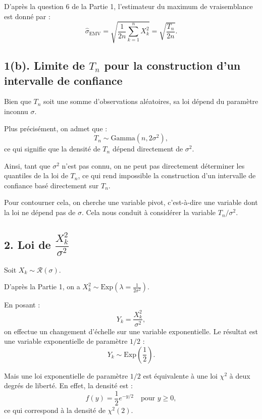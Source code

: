 \documentclass[a4paper,11pt]{article}
\begin{document}
D'après la question 6 de la Partie 1, l'estimateur du maximum de vraisemblance est donné par :
\[
\hat{\sigma}_{\text{EMV}} = \sqrt{\frac{1}{2n} \sum_{k=1}^n X_k^2} = \sqrt{\frac{T_n}{2n}}.
\]


\vspace{1em}
\subsection*{1(b). Limite de $T_n$ pour la construction d’un intervalle de confiance}

Bien que $T_n$ soit une somme d’observations aléatoires, sa loi dépend du paramètre inconnu $\sigma$.

Plus précisément, on admet que :
\[
T_n \sim \text{Gamma}(n, 2\sigma^2),
\]
ce qui signifie que la densité de $T_n$ dépend directement de $\sigma^2$.

Ainsi, tant que $\sigma^2$ n'est pas connu, on ne peut pas directement déterminer les quantiles de la loi de $T_n$, ce qui rend impossible la construction d'un intervalle de confiance basé directement sur $T_n$.

Pour contourner cela, on cherche une variable pivot, c’est-à-dire une variable dont la loi ne dépend pas de $\sigma$. Cela nous conduit à considérer la variable $T_n / \sigma^2$.

\vspace{1em}
\subsection*{2. Loi de $\dfrac{X_k^2}{\sigma^2}$}

Soit $X_k \sim \mathcal{R}(\sigma)$.

D’après la Partie 1, on a $X_k^2 \sim \text{Exp}(\lambda = \frac{1}{2\sigma^2})$.

En posant :
\[
Y_k = \frac{X_k^2}{\sigma^2},
\]
on effectue un changement d’échelle sur une variable exponentielle. Le résultat est une variable exponentielle de paramètre $1/2$ :
\[
Y_k \sim \text{Exp}\left(\frac{1}{2}\right).
\]

Mais une loi exponentielle de paramètre $1/2$ est équivalente à une loi $\chi^2$ à deux degrés de liberté. En effet, la densité est :
\[
f(y) = \frac{1}{2} e^{-y/2} \quad \text{pour } y \geq 0,
\]
ce qui correspond à la densité de $\chi^2(2)$.

\end{document}
